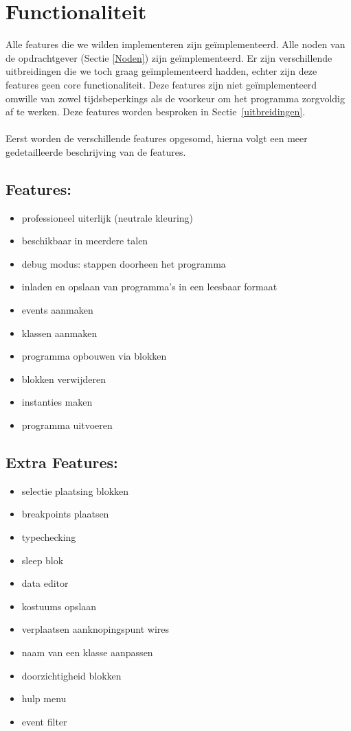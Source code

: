 \documentclass[]{article}
\begin{document}
\section{Functionaliteit}
\label{Functionaliteit}
Alle features die we wilden implementeren zijn ge\"implementeerd. Alle noden van de opdrachtgever (Sectie \ref{Noden}) zijn ge\"implementeerd. Er zijn verschillende uitbreidingen die we toch graag ge\"implementeerd hadden, echter zijn deze features geen core functionaliteit. Deze features zijn niet ge\"implementeerd omwille van zowel tijdsbeperkings als de voorkeur om het programma zorgvoldig af te werken. Deze features worden besproken in Sectie~\ref{uitbreidingen}. \\\\
Eerst worden de verschillende features opgesomd, hierna volgt een meer gedetailleerde beschrijving van de features.

\subsection{Features:}
\begin{itemize}
\item professioneel uiterlijk (neutrale kleuring)
\item beschikbaar in meerdere talen
\item debug modus: stappen doorheen het programma
\item inladen en opslaan van programma's in een leesbaar formaat
\item events aanmaken
\item klassen aanmaken
\item programma opbouwen via blokken
\item blokken verwijderen
\item instanties maken
\item programma uitvoeren
\end{itemize}

\subsection{Extra Features:}
\begin{itemize}
\item selectie plaatsing blokken
\item breakpoints plaatsen
\item typechecking
\item sleep blok
\item data editor
\item kostuums opslaan
\item verplaatsen aanknopingspunt wires
\item naam van een klasse aanpassen
\item doorzichtigheid blokken
\item hulp menu
\item event filter
\end{itemize}
\end{document}
